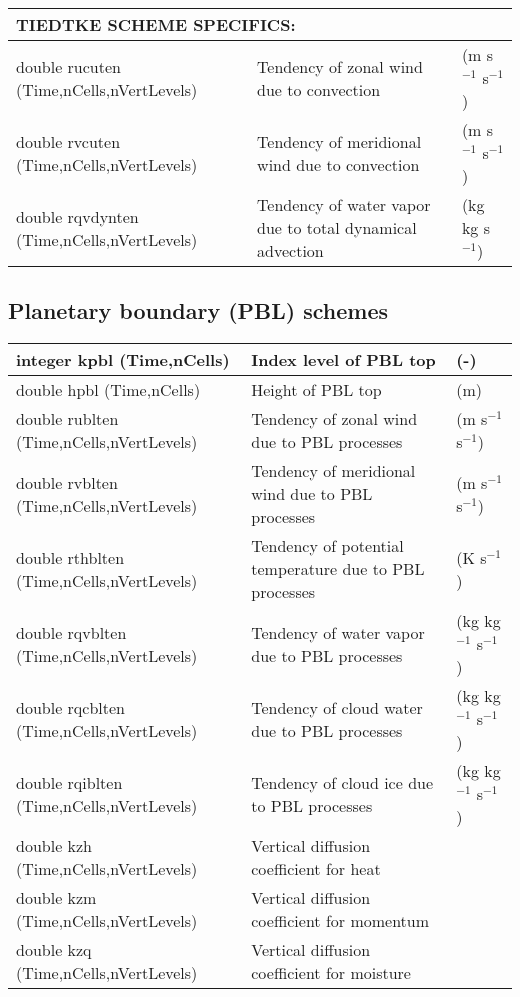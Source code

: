 {\begin{longtable}{|p{2.0in} |p{3.0in} |p{1.0in} |}
        \multicolumn{3}{|l|}{{\rule[-3mm]{0mm}{8mm}\bf TIEDTKE SCHEME SPECIFICS:} \hfill}\\ \hline
        double rucuten \hfil\break (Time,nCells,nVertLevels) & Tendency of zonal wind due to convection & (m s$^{-1}$ s$^{-1}$) \\ \hline
        double rvcuten \hfil\break (Time,nCells,nVertLevels) & Tendency of meridional wind due to convection & (m s$^{-1}$ s$^{-1}$) \\ \hline
        double rqvdynten \hfil\break (Time,nCells,nVertLevels) & Tendency of water vapor due to total dynamical advection & (kg kg s$^{-1}$)\\ \hline
\end{longtable}
}

\subsection{Planetary boundary (PBL) schemes}

{\small
\begin{longtable}{|p{2.0in} |p{3.0in} |p{1.0in}|}
\hline
integer kpbl (Time,nCells)  & Index level of PBL top & (-) \\ \hline
double hpbl (Time,nCells)  & Height of PBL top & (m) \\ \hline
double rublten \hfil\break (Time,nCells,nVertLevels)  & Tendency of zonal wind due to PBL processes  & (m s$^{-1}$ s$^{-1}$) \\ \hline
double rvblten \hfil\break (Time,nCells,nVertLevels)  &  Tendency of meridional wind due to PBL processes & (m s$^{-1}$ s$^{-1}$) \\ \hline
double rthblten  \hfil\break (Time,nCells,nVertLevels)  &  Tendency of potential temperature due to PBL processes& (K s$^{-1}$) \\ \hline
double rqvblten \hfil\break (Time,nCells,nVertLevels)  &  Tendency of water vapor due to PBL processes & (kg kg$^{-1}$ s$^{-1}$) \\ \hline
double rqcblten \hfil\break (Time,nCells,nVertLevels)  &  Tendency of cloud water due to PBL processes & (kg kg$^{-1}$ s$^{-1}$) \\ \hline
double rqiblten \hfil\break (Time,nCells,nVertLevels)  &  Tendency of cloud ice due to PBL processes & (kg kg$^{-1}$ s$^{-1}$) \\ \hline
double kzh \hfil\break (Time,nCells,nVertLevels)  &  Vertical diffusion coefficient for heat &  \\ \hline
double kzm \hfil\break (Time,nCells,nVertLevels)  &  Vertical diffusion coefficient for momentum & \\ \hline
double kzq \hfil\break (Time,nCells,nVertLevels)  &  Vertical diffusion coefficient for moisture & \\ \hline

\end{longtable}
}

